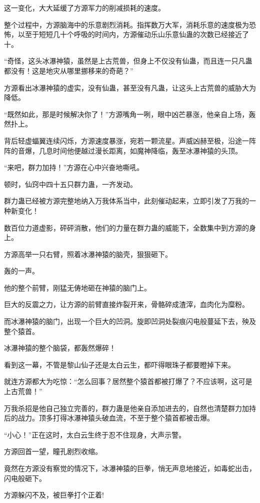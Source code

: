 \begin{this_body}
这一变化，大大延缓了方源军力的削减损耗的速度。

整个过程中，方源脑海中的乐意剧烈消耗。指挥数万大军，消耗乐意的速度极为恐怖，以至于短短几十个呼吸的时间内，方源催动乐山乐意仙蛊的次数已经接近了十。

“奇怪，这头冰瀑神猿，虽然是上古荒兽，但身上不仅没有仙蛊，而且连一只凡蛊都没有！这是地灾从哪里挪移来的奇葩？”

方源看出冰瀑神猿的虚实，没有仙蛊，甚至没有凡蛊，让这头上古荒兽的威胁大为降低。

“既然如此，那是时候解决你了！”方源嘴角一咧，眼中凶芒暴涨，他亲自上场，轰然扑上。

背后轻虚蝠翼连续闪烁，方源速度暴涨，宛若一颗流星。声威凶赫至极，沿途一阵阵的音爆，几息时间他便越过漫长距离，如魔神降临，轰至冰瀑神猿的头顶。

“来吧，群力加持！”方源在心中兴奋地嘶吼。

顿时，仙窍中四十五只群力蛊，一齐发动。

群力蛊已经被方源完整地纳入万我体系当中，此刻催动起来，立即引发了万我的一种新变化！

数百位力道虚影，砰砰消散，他们的力量在群力蛊的威能下，全数集中到方源的身上。

方源高举一只右臂，照着冰瀑神猿的脑壳，狠狠砸下。

轰的一声。

他的整个前臂，刚猛无俦地砸在神猿的脑门上。

巨大的反震之力，让方源的前臂直接炸裂开来，骨骼碎成渣滓，血肉化为糜粉。

而冰瀑神猿的脑门，出现一个巨大的凹洞。旋即凹洞处裂痕闪电般蔓延下去，殃及整个猿首。

冰瀑神猿的整个脑袋，都轰然爆碎！

看到这一幕，不管是黎山仙子还是太白云生，都吓得眼珠子都要瞪掉下来。

就连方源都大为吃惊：“怎么回事？居然整个猿首都被打爆了？不应该啊，这可是上古荒兽！”

万我杀招是他自己独立完善的，群力蛊是他亲自添加进去的，自然也清楚群力加持后的战力。顶多打得冰瀑神猿头破血流，不至于整个猿首都被击爆。

“小心！”正在这时，太白云生终于忍不住现身，大声示警。

方源回首一望，瞳孔剧烈收缩。

竟然在方源没有察觉的情况下，冰瀑神猿的巨拳，悄无声息地接近，如毒蛇出击，闪电般砸下。

方源躲闪不及，被巨拳打个正着!

\end{this_body}

